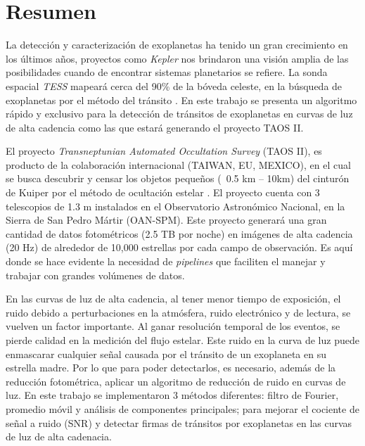 \thispagestyle{plain}
\newpage

\chapter*{\textbf{Resumen}}

La detección y caracterización de exoplanetas ha tenido un gran crecimiento en los últimos años, proyectos como \textit{Kepler} nos brindaron una visión amplia de las posibilidades cuando de encontrar sistemas planetarios se refiere. La sonda espacial \textit{TESS} mapeará cerca del 90\% de la bóveda celeste, en la búsqueda de exoplanetas por el método del tránsito \cite{ricker2014transiting}. En este trabajo se presenta un algoritmo rápido y exclusivo para la detección de tránsitos de exoplanetas en curvas de luz de alta cadencia como las que estará generando el proyecto TAOS II.  

El proyecto \textit{Transneptunian Automated Occultation Survey} (TAOS II), es producto de la colaboración internacional (TAIWAN, EU, MEXICO), en el cual se busca descubrir y censar los objetos pequeños (~0.5 km – 10km) del cinturón de Kuiper por el método de ocultación estelar \cite{lehner2012transneptunian}. El proyecto cuenta con 3 telescopios de 1.3 m instalados en el Observatorio Astronómico Nacional, en la Sierra de San Pedro Mártir (OAN-SPM). Este proyecto generará una gran cantidad de datos fotométricos (2.5 TB por noche) en imágenes de alta cadencia (20 Hz) de alrededor de 10,000 estrellas por cada campo de observación. Es aquí donde se hace evidente la necesidad de \textit{pipelines} que faciliten el manejar y trabajar con grandes volúmenes de datos. 

En las curvas de luz de alta cadencia, al tener menor tiempo de exposición, el ruido debido a perturbaciones en la atmósfera, ruido electrónico y de lectura, se vuelven un factor importante. Al ganar resolución temporal de los eventos, se pierde calidad en la medición del flujo estelar. Este ruido en la curva de luz puede enmascarar cualquier señal causada por el tránsito de un exoplaneta en su estrella madre. Por lo que para poder detectarlos, es necesario, además de la reducción fotométrica, aplicar un algoritmo de reducción de ruido en curvas de luz. En este trabajo se implementaron 3 métodos diferentes: filtro de Fourier, promedio móvil y análisis de componentes principales; para mejorar el cociente de señal a ruido (SNR) y detectar firmas de tránsitos por exoplanetas en las curvas de luz de alta cadenacia. 


